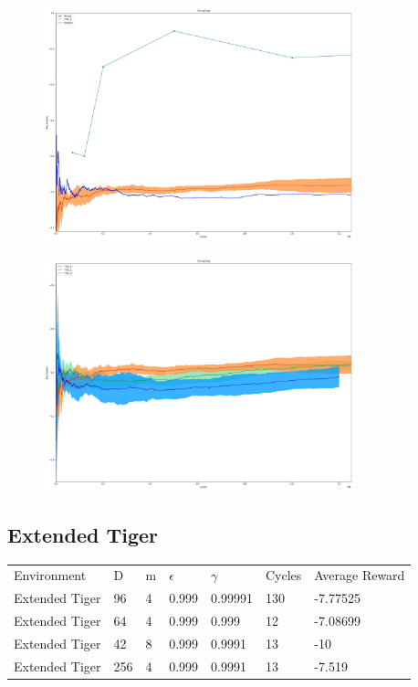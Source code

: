 \documentclass{article}
\theoremstyle{definition}
\newtheorem{primary statistics}[definition]{Primary Statistics}
\newtheorem{auxiliary statistics}[definition]{Auxiliary Statistics}
\begin{document}
 \begin{figure}[h]
 \centering
    \includegraphics[width=9cm]{RvVvU_TicTacToe}
\end{figure}

 \begin{figure}[h]
 \centering
    \includegraphics[width=9cm]{BT_TicTacToe}
\end{figure}


\newpage

\subsection{Extended Tiger}
 \begin{tabular}{lllllll}
  \centering
Environment    & D & m & $\epsilon$ & $\gamma$ & Cycles & Average Reward \\
Extended Tiger & 96        & 4           & 0.999       & 0.99991           & 130    & -7.77525        \\
Extended Tiger & 64        & 4           & 0.999       & 0.999             & 12     & -7.08699       \\
Extended Tiger & 42        & 8           & 0.999       & 0.9991            & 13     & -10             \\
Extended Tiger & 256       & 4           & 0.999       & 0.9991            & 13     & -7.519       
\end{tabular}
\end{document}
